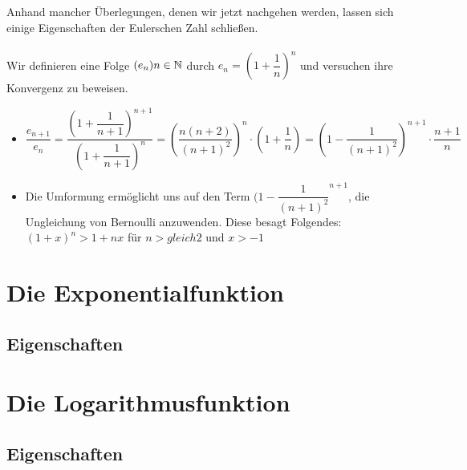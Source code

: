 Anhand mancher Überlegungen, denen wir jetzt nachgehen werden, lassen sich einige Eigenschaften der Eulerschen Zahl schließen.\\
\\ Wir definieren eine Folge $(e_{n})n\in\mathbb{N}$ durch $e_{n}=(1+\dfrac{1}{n})^n$ und versuchen ihre Konvergenz zu beweisen.
\begin{itemize}
\item$\dfrac{e_{n+1}}{e_{n}}=\dfrac{{(1+\dfrac{1}{n+1})}^{n+1}}{{(1+\dfrac{1}{n+1})}^{n}}=(\dfrac{n(n+2)}{(n+1)^2})^n\cdot(1+\dfrac{1}{n})=(1-\dfrac{1}{(n+1)^2})^{n+1}\cdot\dfrac{n+1}{n}$
\item Die Umformung ermöglicht uns auf den Term ${(1-\dfrac{1}{(n+1)^2}}^{n+1}$, die Ungleichung von Bernoulli anzuwenden. Diese besagt Folgendes: $(1+x)^n>1+nx$ für $n>gleich2$ und $x>-1$

\end{itemize}

		\section{Die Exponentialfunktion}

	\subsection{Eigenschaften}

		\section{Die Logarithmusfunktion}

	\subsection{Eigenschaften}
